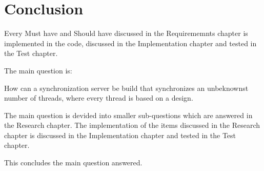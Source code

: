 \hypertarget{conclusion}{%
\section{Conclusion}\label{conclusion}}

Every Must have and Should have discussed in the Requirememnts chapter
is implemented in the code, discussed in the Implementation chapter and
tested in the Test chapter.

The main question is:

How can a synchronization server be build that synchronizes an
unbeknownst number of threads, where every thread is based on a design.

The main question is devided into smaller sub-questions which are
answered in the Research chapter. The implementation of the items
discussed in the Research chapter is discussed in the Implementation
chapter and tested in the Test chapter.

This concludes the main question answered.
